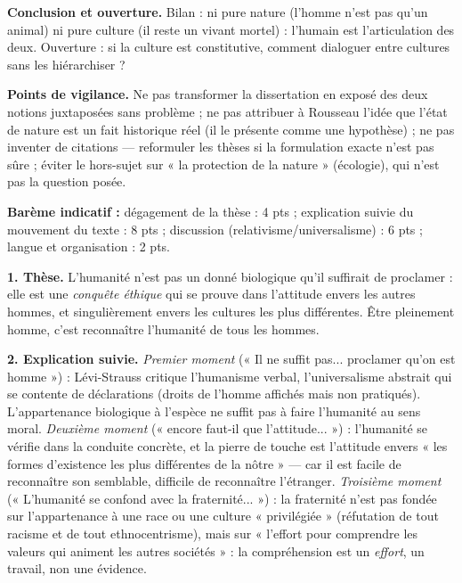\documentclass[11pt]{article}
\begin{document}
\begin{corrige}
\textbf{Conclusion et ouverture.} Bilan : ni pure nature (l'homme n'est pas qu'un animal) ni pure culture (il reste un vivant mortel) : l'humain est l'articulation des deux. Ouverture : si la culture est constitutive, comment dialoguer entre cultures sans les hiérarchiser ?

\textbf{Points de vigilance.} Ne pas transformer la dissertation en exposé des deux notions juxtaposées sans problème ; ne pas attribuer à Rousseau l'idée que l'état de nature est un fait historique réel (il le présente comme une hypothèse) ; ne pas inventer de citations — reformuler les thèses si la formulation exacte n'est pas sûre ; éviter le hors-sujet sur « la protection de la nature » (écologie), qui n'est pas la question posée.
\end{corrige}

\begin{corrige}
\textbf{Barème indicatif :} dégagement de la thèse : 4 pts ; explication suivie du mouvement du texte : 8 pts ; discussion (relativisme/universalisme) : 6 pts ; langue et organisation : 2 pts.

\textbf{1. Thèse.} L'humanité n'est pas un donné biologique qu'il suffirait de proclamer : elle est une \emph{conquête éthique} qui se prouve dans l'attitude envers les autres hommes, et singulièrement envers les cultures les plus différentes. Être pleinement homme, c'est reconnaître l'humanité de tous les hommes.

\textbf{2. Explication suivie.} \emph{Premier moment} (« Il ne suffit pas... proclamer qu'on est homme ») : Lévi-Strauss critique l'humanisme verbal, l'universalisme abstrait qui se contente de déclarations (droits de l'homme affichés mais non pratiqués). L'appartenance biologique à l'espèce ne suffit pas à faire l'humanité au sens moral. \emph{Deuxième moment} (« encore faut-il que l'attitude... ») : l'humanité se vérifie dans la conduite concrète, et la pierre de touche est l'attitude envers « les formes d'existence les plus différentes de la nôtre » — car il est facile de reconnaître son semblable, difficile de reconnaître l'étranger. \emph{Troisième moment} (« L'humanité se confond avec la fraternité... ») : la fraternité n'est pas fondée sur l'appartenance à une race ou une culture « privilégiée » (réfutation de tout racisme et de tout ethnocentrisme), mais sur « l'effort pour comprendre les valeurs qui animent les autres sociétés » : la compréhension est un \emph{effort}, un travail, non une évidence.


\end{corrige}
\end{document}
